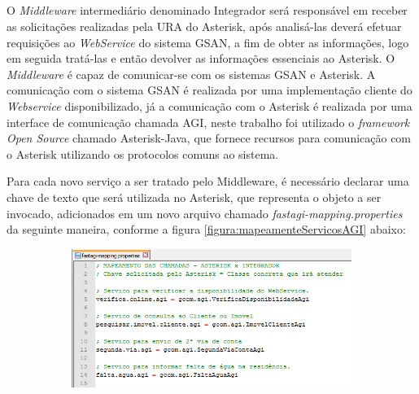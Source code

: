 \subsection{\fontsize{12}{1} }

O \textit{Middleware} intermediário denominado Integrador será responsável em receber as solicitações realizadas pela URA do Asterisk, após analisá-las deverá efetuar requisições ao \textit{WebService} do sistema GSAN, a fim de obter as informações, logo em seguida tratá-las e então devolver as informações essenciais ao Asterisk.
O \textit{Middleware} é capaz de comunicar-se com os sistemas GSAN e Asterisk. A comunicação com o sistema GSAN é realizada por uma implementação cliente do \textit{Webservice} disponibilizado, já a comunicação com o Asterisk é realizada por uma interface de comunicação chamada AGI, neste trabalho foi utilizado o \textit{framework} \textit{Open Source} chamado Asterisk-Java, que fornece recursos para comunicação com o Asterisk utilizando os protocolos comuns ao sistema.

Para cada novo serviço a ser tratado pelo Middleware, é necessário declarar uma chave de texto que será utilizada no Asterisk, que representa o objeto a ser invocado, adicionados em um novo arquivo chamado \textit{fastagi-mapping.properties} da seguinte maneira, conforme a figura \ref{figura:mapeamenteServicosAGI} abaixo:

\begin{figure}[H]
	\centering
	\caption{\textbf{Mapeamento dos serviços para consumo via AGI}}
	\label{figura:mapeamenteServicosAGI}
	\begin{subfigure}[H]{\textwidth}
		\centering
		\includegraphics{figuras/mapeamento_servicos_agi.png}
	\end{subfigure}
\end{figure}



